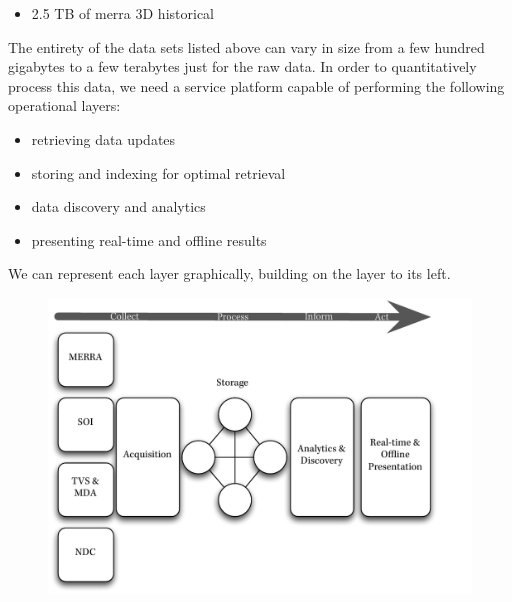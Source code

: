 \begin{itemize}
    \item 2.5 TB of \gls{merra} 3D historical \cite{mdisc}
\end{itemize}
The entirety of the data sets listed above can vary in size from a few hundred gigabytes to a few terabytes just for the raw data. In order to quantitatively process this data, we need a service platform capable of performing the following operational layers:
\begin{itemize}
	\item retrieving data updates
	\item storing and indexing for optimal retrieval
	\item data discovery and analytics
	\item presenting real-time and offline results
\end{itemize}
We can represent each layer graphically, building on the layer to its left. 
\begin{figure}[htp]
    \centering
    \includegraphics[scale=.75]{dataflow}
\end{figure}

